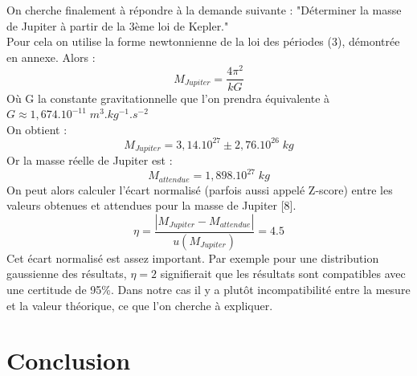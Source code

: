 \documentclass{aa}
\begin{document}
 On cherche finalement à répondre à la demande suivante : "Déterminer la masse de Jupiter à partir de la 3ème loi de Kepler."\\
 Pour cela on utilise la forme newtonnienne de la loi des périodes (3), démontrée en annexe. 
 Alors :
 \begin{equation}
     M_{Jupiter} = \frac{4\pi^2}{kG}  
 \end{equation}
Où G la constante gravitationnelle que l'on prendra équivalente à $ G \approx 1,674.10^{-11} \; m^3.kg^{-1}.s^{-2}$ \\
On obtient : 
 \begin{equation}
    M_{Jupiter} = 3,14.10^{27} \pm 2,76.10^{26} \; kg  
 \end{equation}
 Or la masse réelle de Jupiter est :
\begin{equation}
    M_{attendue} = 1,898.10^{27} \; kg
\end{equation}
On peut alors calculer l'écart normalisé (parfois aussi appelé Z-score) entre les valeurs obtenues et attendues pour la masse de Jupiter [8].
\begin{equation}
    \eta = \frac{|M_{Jupiter}-M_{attendue}|}{u(M_{Jupiter})} = 4.5
\end{equation}
Cet écart normalisé est assez important. Par exemple pour une distribution gaussienne des résultats, $\eta = 2 $ signifierait que les résultats sont compatibles avec une certitude de 95\%. Dans notre cas il y a plutôt incompatibilité entre la mesure et la valeur théorique, ce que l'on cherche à expliquer. 

\section{Conclusion}
\end{document}
